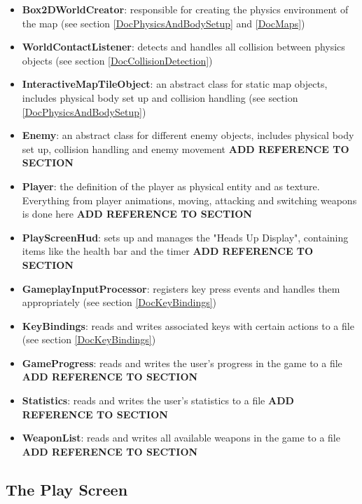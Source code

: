 \documentclass[12p]{article}
\begin{document}
\begin{itemize}
  \item \textbf{Box2DWorldCreator}: responsible for creating the physics environment of the map (see section \ref{DocPhysicsAndBodySetup} and \ref{DocMaps})
  \item \textbf{WorldContactListener}: detects and handles all collision between physics objects (see section \ref{DocCollisionDetection})
  \item \textbf{InteractiveMapTileObject}: an abstract class for static map objects, includes physical body set up and collision handling (see section \ref{DocPhysicsAndBodySetup})
  \item \textbf{Enemy}: an abstract class for different enemy objects, includes physical body set up, collision handling and enemy movement \textbf{ADD REFERENCE TO SECTION}
  \item \textbf{Player}: the definition of the player as physical entity and as texture. Everything from player animations, moving, attacking and switching weapons is done here \textbf{ADD REFERENCE TO SECTION}
  \item \textbf{PlayScreenHud}: sets up and manages the "Heads Up Display", containing items like the health bar and the timer \textbf{ADD REFERENCE TO SECTION}
  \item \textbf{GameplayInputProcessor}: registers key press events and handles them appropriately (see section \ref{DocKeyBindings})
  \item \textbf{KeyBindings}: reads and writes associated keys with certain actions to a file (see section \ref{DocKeyBindings})
  \item \textbf{GameProgress}: reads and writes the user's progress in the game to a file \textbf{ADD REFERENCE TO SECTION}
  \item \textbf{Statistics}: reads and writes the user's statistics to a file \textbf{ADD REFERENCE TO SECTION}
  \item \textbf{WeaponList}: reads and writes all available weapons in the game to a file \textbf{ADD REFERENCE TO SECTION}
\end{itemize}

 
\subsection{The Play Screen} \label{DocPlayScreen}
 
\end{document}
